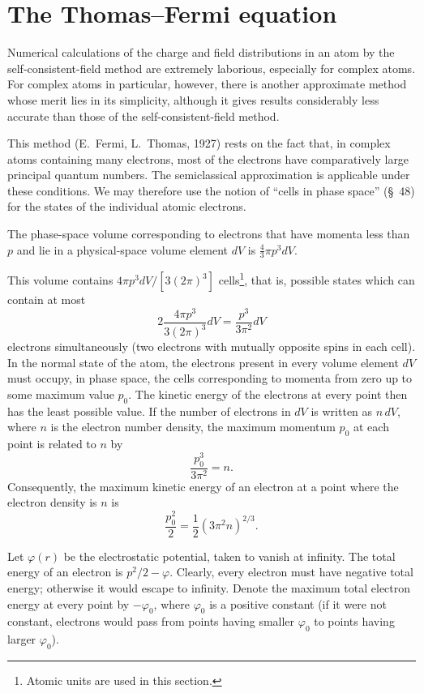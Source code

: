 \section{The Thomas--Fermi equation}

Numerical calculations of the charge and field distributions in an atom by the self-consistent-field method are extremely laborious, especially for complex atoms. For complex atoms in particular, however, there is another approximate method whose merit lies in its simplicity, although it gives results considerably less accurate than those of the self-consistent-field method.

This method (E.~Fermi, L.~Thomas, 1927) rests on the fact that, in complex atoms containing many electrons, most of the electrons have comparatively large principal quantum numbers. The semiclassical approximation is applicable under these conditions. We may therefore use the notion of ``cells in phase space'' (\S~48) for the states of the individual atomic electrons.

The phase-space volume corresponding to electrons that have momenta less than $p$ and lie in a physical-space volume element $dV$ is $\frac43\pi p^3dV$.

This volume contains $4\pi p^3dV/[3(2\pi)^3]$ cells\footnote{Atomic units are used in this section.}, that is, possible states which can contain at most
\[
 2\frac{4\pi p^3}{3(2\pi)^3}dV=\frac{p^3}{3\pi^2}dV
\]
electrons simultaneously (two electrons with mutually opposite spins in each cell). In the normal state of the atom, the electrons present in every volume element $dV$ must occupy, in phase space, the cells corresponding to momenta from zero up to some maximum value $p_0$. The kinetic energy of the electrons at every point then has the least possible value. If the number of electrons in $dV$ is written as $n\,dV$, where $n$ is the electron number density, the maximum momentum $p_0$ at each point is related to $n$ by
\[
 \frac{p_0^3}{3\pi^2}=n.
\]
Consequently, the maximum kinetic energy of an electron at a point where the electron density is $n$ is
\begin{equation}\frac{p_0^2}{2}=\frac12(3\pi^2n)^{2/3}.\tag{70.1}\end{equation}

Let $\varphi(r)$ be the electrostatic potential, taken to vanish at infinity. The total energy of an electron is $p^2/2-\varphi$. Clearly, every electron must have negative total energy; otherwise it would escape to infinity. Denote the maximum total electron energy at every point by $-\varphi_0$, where $\varphi_0$ is a positive constant (if it were not constant, electrons would pass from points having smaller $\varphi_0$ to points having larger $\varphi_0$).

